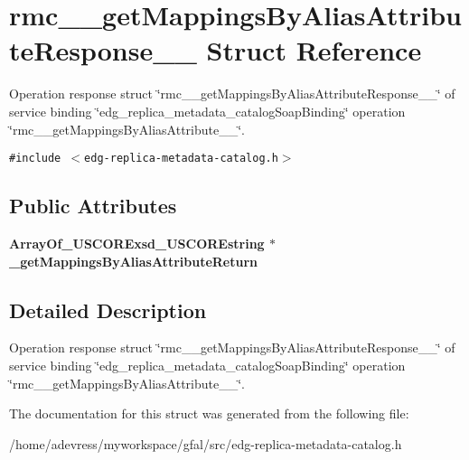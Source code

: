 \section{rmc\_\-\_\-get\-Mappings\-By\-Alias\-Attribute\-Response\_\-\_\- Struct Reference}
\label{structrmc____getMappingsByAliasAttributeResponse____}
Operation response struct \char`\"{}rmc\_\-\_\-get\-Mappings\-By\-Alias\-Attribute\-Response\_\-\_\-\char`\"{} of service binding \char`\"{}edg\_\-replica\_\-metadata\_\-catalog\-Soap\-Binding\char`\"{} operation \char`\"{}rmc\_\-\_\-get\-Mappings\-By\-Alias\-Attribute\_\-\_\-\char`\"{}.  


{\tt \#include $<$edg-replica-metadata-catalog.h$>$}

\subsection*{Public Attributes}
\begin{CompactItemize}
\item 
\bf{Array\-Of\_\-USCORExsd\_\-USCOREstring} $\ast$ \textbf{\_\-get\-Mappings\-By\-Alias\-Attribute\-Return}\label{structrmc____getMappingsByAliasAttributeResponse_____cae8bd5cb957d453a67b5c7c0eb1c36f}

\end{CompactItemize}


\subsection{Detailed Description}
Operation response struct \char`\"{}rmc\_\-\_\-get\-Mappings\-By\-Alias\-Attribute\-Response\_\-\_\-\char`\"{} of service binding \char`\"{}edg\_\-replica\_\-metadata\_\-catalog\-Soap\-Binding\char`\"{} operation \char`\"{}rmc\_\-\_\-get\-Mappings\-By\-Alias\-Attribute\_\-\_\-\char`\"{}. 



The documentation for this struct was generated from the following file:\begin{CompactItemize}
\item 
/home/adevress/myworkspace/gfal/src/edg-replica-metadata-catalog.h\end{CompactItemize}
